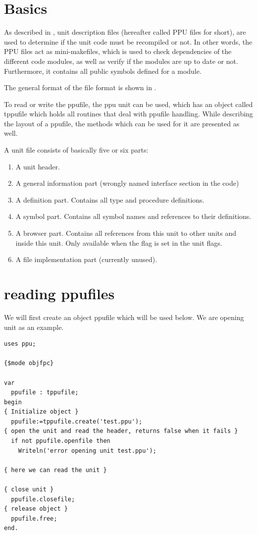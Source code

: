 \section{Basics}
As described in , unit description files (hereafter
called PPU files for short), are used to determine if the unit
code must be recompiled or not. In other words, the PPU files act
as mini-makefiles, which is used to check dependencies of the
different code modules, as well as verify if the modules are up
to date or not. Furthermore, it contains all public symbols defined
for a module.

The general format of the  file format is shown
in .


To read or write the ppufile, the ppu unit  can be used,
which has an object called tppufile which holds all routines that deal
with ppufile handling. While describing the layout of a ppufile, the
methods which can be used for it are presented as well.

A unit file consists of basically five or six parts:
\begin{enumerate}
\item A unit header.
\item A general information part (wrongly named interface section in the code)
\item A definition part. Contains all type and procedure definitions.
\item A symbol part. Contains all symbol names and references to their
definitions.
\item A browser part. Contains all references from this unit to other
units and inside this unit. Only available when the  flag is
set in the unit flags.
\item A file implementation part (currently unused).
\end{enumerate}

\section{reading ppufiles}

We will first create an object ppufile which will be used below. We are
opening unit  as an example.

\begin{verbatim}
uses ppu;

{$mode objfpc}

var
  ppufile : tppufile;
begin
{ Initialize object }
  ppufile:=tppufile.create('test.ppu');
{ open the unit and read the header, returns false when it fails }
  if not ppufile.openfile then
    Writeln('error opening unit test.ppu');

{ here we can read the unit }

{ close unit }
  ppufile.closefile;
{ release object }
  ppufile.free;
end.
\end{verbatim}

